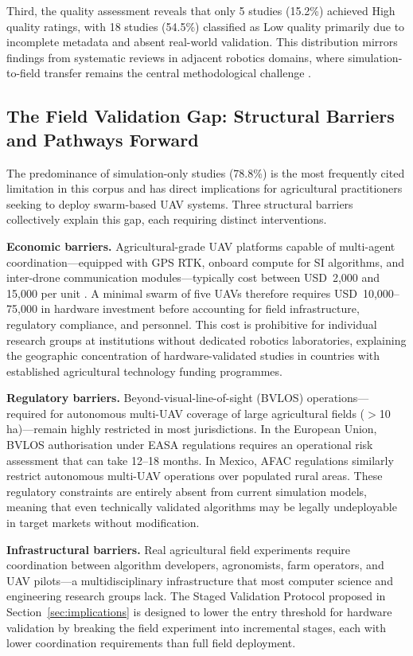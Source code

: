 \documentclass[review,3p,times]{elsarticle}
\begin{document}
Third, the quality assessment reveals that only 5 studies (15.2\%) achieved High quality ratings, with 18 studies (54.5\%) classified as Low quality primarily due to incomplete metadata and absent real-world validation. This distribution mirrors findings from systematic reviews in adjacent robotics domains, where simulation-to-field transfer remains the central methodological challenge \cite{brambilla2013}.

\subsection{The Field Validation Gap: Structural Barriers and Pathways Forward}

The predominance of simulation-only studies (78.8\%) is the most frequently cited limitation in this corpus and has direct implications for agricultural practitioners seeking to deploy swarm-based UAV systems. Three structural barriers collectively explain this gap, each requiring distinct interventions.

\textbf{Economic barriers.} Agricultural-grade UAV platforms capable of multi-agent coordination---equipped with GPS RTK, onboard compute for SI algorithms, and inter-drone communication modules---typically cost between USD~2,000 and 15,000 per unit \cite{phung2021}. A minimal swarm of five UAVs therefore requires USD~10,000--75,000 in hardware investment before accounting for field infrastructure, regulatory compliance, and personnel. This cost is prohibitive for individual research groups at institutions without dedicated robotics laboratories, explaining the geographic concentration of hardware-validated studies in countries with established agricultural technology funding programmes.

\textbf{Regulatory barriers.} Beyond-visual-line-of-sight (BVLOS) operations---required for autonomous multi-UAV coverage of large agricultural fields ($>$10\,ha)---remain highly restricted in most jurisdictions. In the European Union, BVLOS authorisation under EASA regulations requires an operational risk assessment that can take 12--18 months. In Mexico, AFAC regulations similarly restrict autonomous multi-UAV operations over populated rural areas. These regulatory constraints are entirely absent from current simulation models, meaning that even technically validated algorithms may be legally undeployable in target markets without modification.

\textbf{Infrastructural barriers.} Real agricultural field experiments require coordination between algorithm developers, agronomists, farm operators, and UAV pilots---a multidisciplinary infrastructure that most computer science and engineering research groups lack. The Staged Validation Protocol proposed in Section~\ref{sec:implications} is designed to lower the entry threshold for hardware validation by breaking the field experiment into incremental stages, each with lower coordination requirements than full field deployment.
\end{document}
